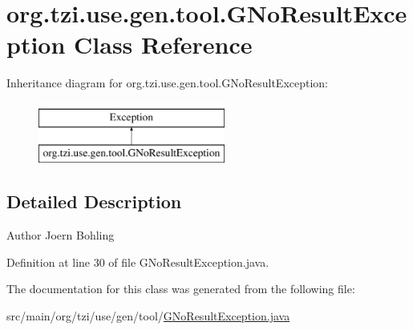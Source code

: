 \hypertarget{classorg_1_1tzi_1_1use_1_1gen_1_1tool_1_1_g_no_result_exception}{\section{org.\-tzi.\-use.\-gen.\-tool.\-G\-No\-Result\-Exception Class Reference}
\label{classorg_1_1tzi_1_1use_1_1gen_1_1tool_1_1_g_no_result_exception}
}
Inheritance diagram for org.\-tzi.\-use.\-gen.\-tool.\-G\-No\-Result\-Exception\-:\begin{figure}[H]
\begin{center}
\leavevmode
\includegraphics[height=2.000000cm]{classorg_1_1tzi_1_1use_1_1gen_1_1tool_1_1_g_no_result_exception}
\end{center}
\end{figure}


\subsection{Detailed Description}
\begin{DoxyAuthor}{Author}
Joern Bohling 
\end{DoxyAuthor}


Definition at line 30 of file G\-No\-Result\-Exception.\-java.



The documentation for this class was generated from the following file\-:\begin{DoxyCompactItemize}
\item 
src/main/org/tzi/use/gen/tool/\hyperlink{_g_no_result_exception_8java}{G\-No\-Result\-Exception.\-java}\end{DoxyCompactItemize}
